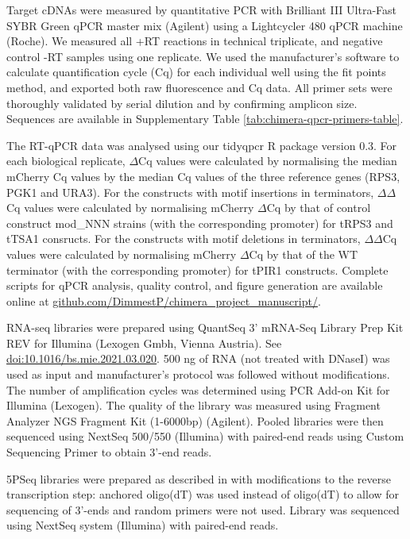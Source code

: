 \documentclass[../main.tex]{subfiles}
\begin{document}
Target cDNAs were measured by quantitative PCR with Brilliant III Ultra-Fast SYBR Green qPCR master mix (Agilent) using a Lightcycler 480 qPCR machine (Roche).
We measured all +RT reactions in technical triplicate, and negative control -RT samples using one replicate.
We used the manufacturer's software to calculate quantification cycle (Cq) for each individual well using the fit points method, and exported both raw fluorescence and Cq data.
All primer sets were thoroughly validated by serial dilution and by confirming amplicon size. Sequences are available in Supplementary Table \ref{tab:chimera-qpcr-primers-table}.

The RT-qPCR data was analysed using our tidyqpcr R package version 0.3.
For each biological replicate, \(\Delta\)Cq values were calculated by normalising the median mCherry Cq values by the median Cq values of the three reference genes (RPS3, PGK1 and URA3).
For the constructs with motif insertions in terminators, \(\Delta\Delta\)Cq values were calculated by normalising mCherry \(\Delta\)Cq by that of control construct mod\_NNN strains (with the corresponding promoter) for tRPS3 and tTSA1 consructs.
For the constructs with motif deletions in terminators, \(\Delta\Delta\)Cq values were calculated by normalising mCherry \(\Delta\)Cq by that of the WT terminator (with the corresponding promoter) for tPIR1 constructs.
Complete scripts for qPCR analysis, quality control, and figure generation are available online at \href{https://github.com/DimmestP/chimera_project_manuscript/}{github.com/DimmestP/chimera\_project\_manuscript/}.

RNA-seq libraries were prepared using QuantSeq 3' mRNA-Seq Library Prep Kit REV for Illumina (Lexogen Gmbh, Vienna Austria).
See \href{https://doi.org/10.1016/bs.mie.2021.03.020}{doi:10.1016/bs.mie.2021.03.020}.
500 ng of RNA (not treated with DNaseI) was used as input and manufacturer's protocol was followed without modifications.
The number of amplification cycles was determined using PCR Add-on Kit for Illumina (Lexogen).
The quality of the library was measured using Fragment Analyzer NGS Fragment Kit (1-6000bp) (Agilent).
Pooled libraries were then sequenced using NextSeq 500/550 (Illumina) with paired-end reads using Custom Sequencing Primer to obtain 3'-end reads.

5PSeq libraries were prepared as described in \parencite{Zhang2021} with modifications to the reverse transcription step: anchored oligo(dT) was used instead of oligo(dT) to allow for sequencing of 3'-ends and random primers were not used.
Library was sequenced using NextSeq system (Illumina) with paired-end reads.
\end{document}
